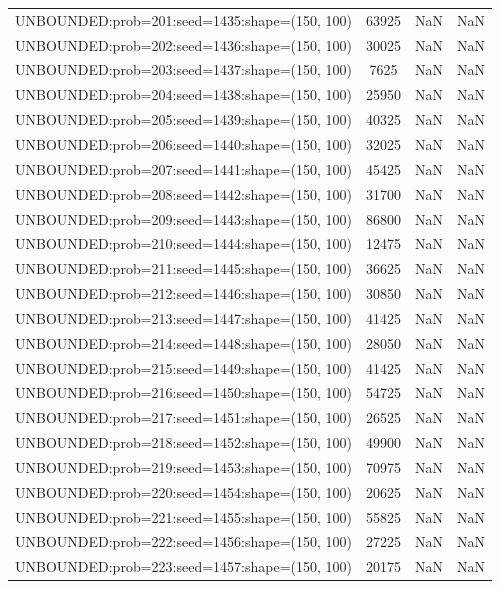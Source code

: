 \begin{longtable}{lccc}
UNBOUNDED:prob=201:seed=1435:shape=(150, 100) & 63925 &   NaN &    NaN \\
UNBOUNDED:prob=202:seed=1436:shape=(150, 100) & 30025 &   NaN &    NaN \\
UNBOUNDED:prob=203:seed=1437:shape=(150, 100) &  7625 &   NaN &    NaN \\
UNBOUNDED:prob=204:seed=1438:shape=(150, 100) & 25950 &   NaN &    NaN \\
UNBOUNDED:prob=205:seed=1439:shape=(150, 100) & 40325 &   NaN &    NaN \\
UNBOUNDED:prob=206:seed=1440:shape=(150, 100) & 32025 &   NaN &    NaN \\
UNBOUNDED:prob=207:seed=1441:shape=(150, 100) & 45425 &   NaN &    NaN \\
UNBOUNDED:prob=208:seed=1442:shape=(150, 100) & 31700 &   NaN &    NaN \\
UNBOUNDED:prob=209:seed=1443:shape=(150, 100) & 86800 &   NaN &    NaN \\
UNBOUNDED:prob=210:seed=1444:shape=(150, 100) & 12475 &   NaN &    NaN \\
UNBOUNDED:prob=211:seed=1445:shape=(150, 100) & 36625 &   NaN &    NaN \\
UNBOUNDED:prob=212:seed=1446:shape=(150, 100) & 30850 &   NaN &    NaN \\
UNBOUNDED:prob=213:seed=1447:shape=(150, 100) & 41425 &   NaN &    NaN \\
UNBOUNDED:prob=214:seed=1448:shape=(150, 100) & 28050 &   NaN &    NaN \\
UNBOUNDED:prob=215:seed=1449:shape=(150, 100) & 41425 &   NaN &    NaN \\
UNBOUNDED:prob=216:seed=1450:shape=(150, 100) & 54725 &   NaN &    NaN \\
UNBOUNDED:prob=217:seed=1451:shape=(150, 100) & 26525 &   NaN &    NaN \\
UNBOUNDED:prob=218:seed=1452:shape=(150, 100) & 49900 &   NaN &    NaN \\
UNBOUNDED:prob=219:seed=1453:shape=(150, 100) & 70975 &   NaN &    NaN \\
UNBOUNDED:prob=220:seed=1454:shape=(150, 100) & 20625 &   NaN &    NaN \\
UNBOUNDED:prob=221:seed=1455:shape=(150, 100) & 55825 &   NaN &    NaN \\
UNBOUNDED:prob=222:seed=1456:shape=(150, 100) & 27225 &   NaN &    NaN \\
UNBOUNDED:prob=223:seed=1457:shape=(150, 100) & 20175 &   NaN &    NaN \\

\end{longtable}
